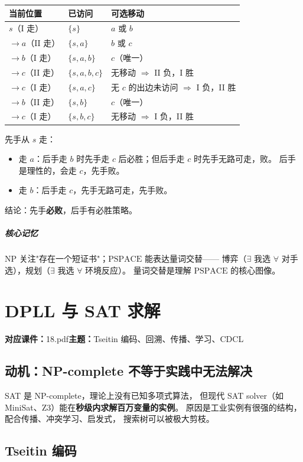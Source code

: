 \documentclass[UTF8,openany,12pt]{ctexbook}
\theoremstyle{remark}
\newcommand{\lecture}[3]{
  \chapter{#2}
  \noindent\textbf{对应课件：}#1\hfill\textbf{主题：}#3
  \vspace{0.6em}
}
\newcommand{\keypoint}[1]{\paragraph{核心记忆}#1}
\newcommand{\NP}{\mathrm{NP}}
\newcommand{\PSPACE}{\mathrm{PSPACE}}
\begin{document}
\begin{center}
\begin{tabular}{lll}
  \toprule
  当前位置 & 已访问 & 可选移动 \\
  \midrule
  $s$（I 走）& $\{s\}$ & $a$ 或 $b$ \\
  \quad $\to a$（II 走）& $\{s,a\}$ & $b$ 或 $c$ \\
  \quad\quad $\to b$（I 走）& $\{s,a,b\}$ & $c$（唯一）\\
  \quad\quad\quad $\to c$（II 走）& $\{s,a,b,c\}$ & 无移动 $\Rightarrow$ II 负，I 胜 \\
  \quad\quad $\to c$（I 走）& $\{s,a,c\}$ & 无 $c$ 的出边未访问 $\Rightarrow$ I 负，II 胜 \\
  \quad $\to b$（II 走）& $\{s,b\}$ & $c$（唯一）\\
  \quad\quad $\to c$（I 走）& $\{s,b,c\}$ & 无移动 $\Rightarrow$ I 负，II 胜 \\
  \bottomrule
\end{tabular}
\end{center}

先手从 $s$ 走：
\begin{itemize}
  \item 走 $a$：后手走 $b$ 时先手走 $c$ 后必胜；但后手走 $c$ 时先手无路可走，败。
        后手是理性的，会走 $c$，先手败。
  \item 走 $b$：后手走 $c$，先手无路可走，先手败。
\end{itemize}
结论：先手\textbf{必败}，后手有必胜策略。

\keypoint{
  $\NP$ 关注"存在一个短证书"；$\PSPACE$ 能表达量词交替——
  博弈（$\exists$ 我选 $\forall$ 对手选），规划（$\exists$ 我选 $\forall$ 环境反应）。
  量词交替是理解 $\PSPACE$ 的核心图像。
}

\lecture{18.pdf}{DPLL 与 SAT 求解}{Tseitin 编码、回溯、传播、学习、CDCL}

\section*{动机：NP-complete 不等于实践中无法解决}

SAT 是 NP-complete，理论上没有已知多项式算法，
但现代 SAT solver（如 MiniSat、Z3）能在\textbf{秒级内求解百万变量的实例}。
原因是工业实例有很强的结构，配合传播、冲突学习、启发式，
搜索树可以被极大剪枝。

\section{Tseitin 编码}
\end{document}
